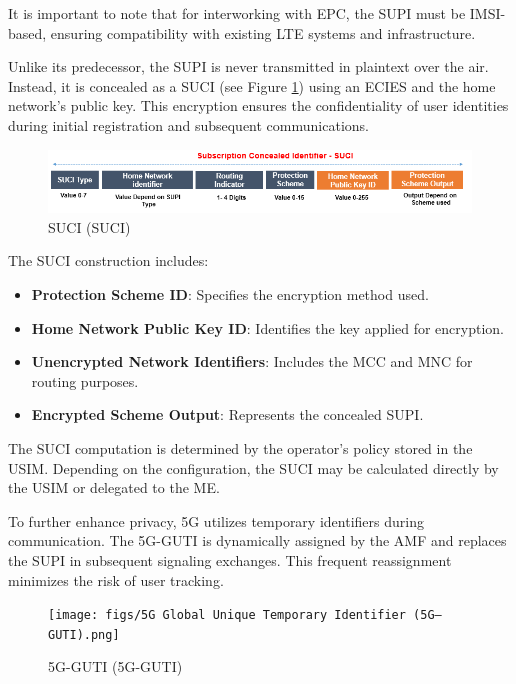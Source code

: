 It is important to note that for interworking with \ac{EPC}, the \ac{SUPI} must be \ac{IMSI}-based, ensuring compatibility with existing \ac{LTE} systems and infrastructure.

Unlike its predecessor, the \ac{SUPI} is never transmitted in plaintext over the air. Instead, it is concealed as a \ac{SUCI} (see Figure \ref{fig:Subscription Concealed Identifier (SUCI)}) using an \ac{ECIES} and the home network’s public key. This encryption ensures the confidentiality of user identities during initial registration and subsequent communications.

\begin{figure}
    \centering
    \includegraphics[width=0.75\linewidth]{figs/Subscription Concealed Identifier (SUCI).png}
    \caption{\acl{SUCI} (\ac{SUCI})}
    \label{fig:Subscription Concealed Identifier (SUCI)}
\end{figure}

The \ac{SUCI} construction includes:
\begin{itemize}
    \item{
                \textbf{Protection Scheme ID}: Specifies the encryption method used.
          }
    \item{
                \textbf{Home Network Public Key ID}: Identifies the key applied for encryption.
          }
    \item{
                \textbf{Unencrypted Network Identifiers}: Includes the \ac{MCC} and \ac{MNC} for routing purposes.
          }
    \item{
                \textbf{Encrypted Scheme Output}: Represents the concealed \ac{SUPI}.
          }
\end{itemize}

The \ac{SUCI} computation is determined by the operator's policy stored in the \ac{USIM}. Depending on the configuration, the \ac{SUCI} may be calculated directly by the \ac{USIM} or delegated to the \ac{ME}.

To further enhance privacy, \ac{5G} utilizes temporary identifiers during communication. The \acl{5G-GUTI} is dynamically assigned by the \ac{AMF} and replaces the \ac{SUPI} in subsequent signaling exchanges. This frequent reassignment minimizes the risk of user tracking.

\begin{figure}
    \centering
    \texttt{[image: figs/5G Global Unique Temporary Identifier (5G–GUTI).png]}
    \caption{\acl{5G-GUTI} (\ac{5G-GUTI})}
    \label{fig:5G Global Unique Temporary Identifier (5G–GUTI)}
\end{figure}

